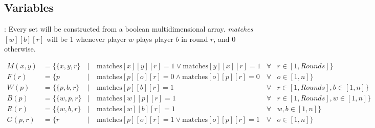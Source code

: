 \documentclass[9pt, aspectratio=169, xcolor=table]{beamer}
\begin{document}
\subsection{Variables}
\begin{frame}{\secname: \subsecname}
    Every set will be constructed from a boolean multidimensional array. \textit{matches}$[w][b][r]$ will be 1 whenever player $w$ plays player $b$ in round $r$, and 0 otherwise.
    \begin{tcolorbox}[colback=gray!30, colframe=Veronablue, arc=0pt, outer arc=0pt, title = \textbf{Set constructions}]
	\begin{align*}
	    M(x, y)   &= \{ \{x, y, r\} &|& \ \text{matches}[x][y][r] = 1 \lor \text{matches}[y][x][r] = 1   &\forall &r \in [1, Rounds]\}\\
	    F(r)      &= \{ p           &|& \ \text{matches}[p][o][r] = 0 \land \text{matches}[o][p][r] = 0  &\forall &o \in [1, n]\}\\
	    W(p)      &= \{ \{p, b, r\} &|& \ \text{matches}[p][b][r] = 1                                    &\forall &r \in [1, Rounds], b \in [1, n]\}\\
	    B(p)      &= \{ \{w, p, r\} &|& \ \text{matches}[w][p][r] = 1                                    &\forall &r \in [1, Rounds], w \in [1, n]\}\\
	    R(r)      &= \{ \{w, b, r\} &|& \ \text{matches}[w][b][r] = 1                                    &\forall &w, b \in [1, n]\}\\
	    G(p, r)   &= \{ r           &|& \ \text{matches}[p][o][r] = 1  \lor \text{matches}[o][p][r] = 1  &\forall &o \in [1, n]\}\\
	\end{align*}
    \end{tcolorbox}
\end{frame}
\end{document}

